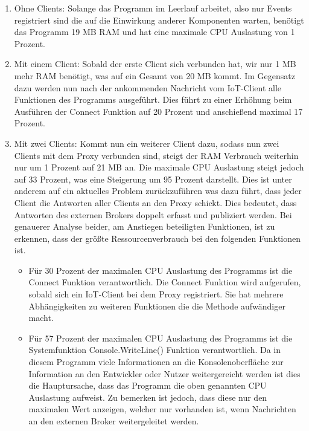     \begin{enumerate}
        \item Ohne Clients:
        Solange das Programm im Leerlauf arbeitet, also nur Events registriert sind die auf die Einwirkung anderer Komponenten warten, benötigt das Programm 19 MB \ac{RAM} und hat eine maximale CPU Auslastung von 1 Prozent.
        \item Mit einem Client:
        Sobald der erste Client sich verbunden hat, wir nur 1 MB mehr \ac{RAM} benötigt, was auf ein Gesamt von 20 MB kommt. Im Gegensatz dazu werden nun nach der ankommenden Nachricht vom \ac{IoT}-Client alle Funktionen des Programms ausgeführt. Dies führt zu einer Erhöhung beim Ausführen der Connect Funktion auf 20 Prozent und anschießend maximal 17 Prozent.
        \item Mit zwei Clients:
        Kommt nun ein weiterer Client dazu, sodass nun zwei Clients mit dem Proxy verbunden sind, steigt der \ac{RAM} Verbrauch weiterhin nur um 1 Prozent auf 21 MB an. Die maximale CPU Auslastung steigt jedoch auf 33 Prozent, was eine Steigerung um 95 Prozent darstellt. Dies ist unter anderem auf ein aktuelles Problem %
        zurückzuführen was dazu führt, dass jeder Client die Antworten aller Clients an den Proxy schickt. Dies bedeutet, dass Antworten des externen Brokers doppelt erfasst und publiziert werden.
        Bei genauerer Analyse beider, am Anstiegen beteiligten Funktionen, ist zu erkennen, dass der größte Ressourcenverbrauch bei den folgenden Funktionen ist.
        \begin{itemize}
            \item Für 30 Prozent der maximalen CPU Auslastung des Programms ist die Connect Funktion verantwortlich. Die Connect Funktion wird aufgerufen, sobald sich ein \ac{IoT}-Client bei dem Proxy registriert. Sie hat mehrere Abhängigkeiten zu weiteren Funktionen die die Methode aufwändiger macht.  
            \item Für 57 Prozent der maximalen CPU Auslastung des Programms ist die Systemfunktion Console.WriteLine() Funktion verantwortlich. Da in diesem Programm viele Informationen an die Konsolenoberfläche zur Information an den Entwickler oder Nutzer weitergereicht werden ist dies die Hauptursache, dass das Programm die oben genannten CPU Auslastung aufweist. Zu bemerken ist jedoch, dass diese nur den maximalen Wert anzeigen, welcher nur vorhanden ist, wenn Nachrichten an den externen Broker weitergeleitet werden.
        \end{itemize}
    \end{enumerate}